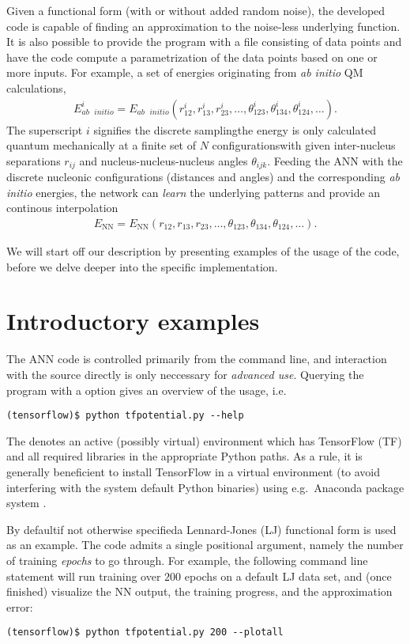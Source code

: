 \documentclass[../../master.tex]{subfiles}
\begin{document}
Given a functional form (with or without added random noise), the developed code is capable of finding an approximation to the noise-less underlying function. It is also possible to provide the program with a file consisting of data points and have the code compute a parametrization of the data points based on one or more inputs. For example, a set of energies originating from \emph{ab initio} QM calculations,
\begin{align}
E_{ab\text{ }initio}^i=E_{ab\text{ }initio}(r^i_{12},r^i_{13},r^i_{23},\dots,\theta^i_{123},\theta^i_{134},\theta^i_{124},\dots).
\end{align}
The superscript $i$ signifies the discrete sampling\textemdash the energy is only calculated quantum mechanically at a finite set of $N$ configurations\textemdash with given inter-nucleus separations $r_{ij}$ and nucleus-nucleus-nucleus angles $\theta_{ijk}$. Feeding the ANN with the discrete nucleonic configurations (distances and angles) and the corresponding \emph{ab initio} energies, the network can \emph{learn} the underlying patterns and provide an continous interpolation 
\begin{align}
E_\text{NN}=E_\text{NN}(r_{12},r_{13},r_{23},\dots,\theta_{123},\theta_{134},\theta_{124},\dots).
\end{align}

We will start off our description by presenting examples of the usage of the code, before we delve deeper into the specific implementation. 

\section{Introductory examples \label{nnimpintro}}
The ANN code is controlled primarily from the command line, and interaction with the source directly is only neccessary for \emph{advanced use}. Querying the program with a  option gives an overview of the usage, i.e.\
\begin{lstlisting}
(tensorflow)$ python tfpotential.py --help
\end{lstlisting}
The  denotes an active (possibly virtual) environment which has TensorFlow (TF) and all required libraries in the appropriate Python paths. As a rule, it is generally beneficient to install TensorFlow in a virtual environment (to avoid interfering with the system default Python binaries) using e.g.\ Anaconda package system \cite{anaconda}. 

By default\textemdash if not otherwise specified\textemdash a Lennard-Jones (LJ) functional form is used as an example. The code admits a single positional argument, namely the number of training \emph{epochs} to go through. For example, the following command line statement will run training over $200$ epochs on a default LJ data set, and (once finished) visualize the NN output, the training progress, and the approximation error:
\begin{lstlisting}
(tensorflow)$ python tfpotential.py 200 --plotall
\end{lstlisting}
\end{document}
